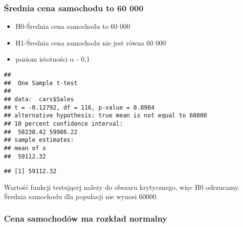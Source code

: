 \documentclass[
]{article}
\newenvironment{Shaded}{\begin{snugshade}}{\end{snugshade}}
\newcommand{\AttributeTok}[1]{\textcolor[rgb]{0.77,0.63,0.00}{#1}}
\newcommand{\CommentTok}[1]{\textcolor[rgb]{0.56,0.35,0.01}{\textit{#1}}}
\newcommand{\DecValTok}[1]{\textcolor[rgb]{0.00,0.00,0.81}{#1}}
\newcommand{\FloatTok}[1]{\textcolor[rgb]{0.00,0.00,0.81}{#1}}
\newcommand{\FunctionTok}[1]{\textcolor[rgb]{0.00,0.00,0.00}{#1}}
\newcommand{\NormalTok}[1]{#1}
\newcommand{\SpecialCharTok}[1]{\textcolor[rgb]{0.00,0.00,0.00}{#1}}
\newcommand{\StringTok}[1]{\textcolor[rgb]{0.31,0.60,0.02}{#1}}
\providecommand{\tightlist}{%
  \setlength{\itemsep}{0pt}\setlength{\parskip}{0pt}}
\begin{document}
\hypertarget{ux15brednia-cena-samochodu-to-60-000}{%
\subsubsection{Średnia cena samochodu to 60
000}\label{ux15brednia-cena-samochodu-to-60-000}}

\begin{itemize}
\tightlist
\item
  H0-Średnia cena samochodu to 60 000
\item
  H1-Średnia cena samochodu nie jest równa 60 000
\item
  poziom istotności \(\alpha\) - 0,1
\end{itemize}

\begin{Shaded}
\end{Shaded}

\begin{verbatim}
## 
##  One Sample t-test
## 
## data:  cars$Sales
## t = -0.12792, df = 116, p-value = 0.8984
## alternative hypothesis: true mean is not equal to 60000
## 10 percent confidence interval:
##  58238.42 59986.22
## sample estimates:
## mean of x 
##  59112.32
\end{verbatim}

\begin{Shaded}
\end{Shaded}

\begin{verbatim}
## [1] 59112.32
\end{verbatim}

Wartość funkcji testującej należy do obszaru krytycznego, więc H0
odrzucamy. Średnia samochodu dla populacji nie wynosi 60000.

\hypertarget{cena-samochoduxf3w-ma-rozkux142ad-normalny}{%
\subsubsection{Cena samochodów ma rozkład
normalny}\label{cena-samochoduxf3w-ma-rozkux142ad-normalny}}
\end{document}
